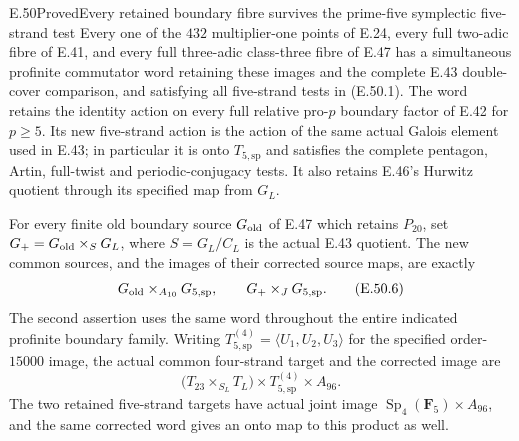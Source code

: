 \begin{statement}{E.50}{Proved}{Every retained boundary fibre survives the prime-five symplectic five-strand test}
Every one of the $432$ multiplier-one points of E.24,
every full two-adic fibre of E.41, and every full
three-adic class-three fibre of E.47 has a simultaneous
profinite commutator word retaining these images and the
complete E.43 double-cover comparison, and satisfying
all five-strand tests in \textup{(E.50.1)}.
The word retains the identity action on every full
relative pro-$p$ boundary factor of E.42 for $p\ge5$.
Its new five-strand action is the action of the same
actual Galois element used in E.43; in particular it is
onto $T_{5,\mathrm{sp}}$ and satisfies the complete
pentagon, Artin, full-twist and periodic-conjugacy tests.
It also retains E.46's Hurwitz quotient through its
specified map from $G_L$.

For every finite old boundary source $G_{\rm old}$ of
E.47 which retains $P_{20}$, set
$G_+=G_{\rm old}\times_S G_L$, where $S=G_L/C_L$
is the actual E.43 quotient.  The new common sources,
and the images of their corrected source maps, are exactly
\[
 G_{\rm old}\times_{A_{10}}G_{5,\mathrm{sp}},
       \qquad
 G_+\times_JG_{5,\mathrm{sp}}.
 \tag{E.50.6}
\]
The second assertion uses the same word throughout the
entire indicated profinite boundary family.
Writing $T_{5,\mathrm{sp}}^{(4)}=\langle U_1,U_2,U_3\rangle$
for the specified order-$15000$ image, the actual common
four-strand target and the corrected image are
\[
 \bigl(T_{23}\times_{S_L}T_L\bigr)
               \times T_{5,\mathrm{sp}}^{(4)}\times A_{96}.
\]
The two retained five-strand targets have actual joint
image $\operatorname{Sp}_4(\mathbf F_5)\times A_{96}$,
and the same corrected word gives an onto map to this
product as well.
\end{statement}

